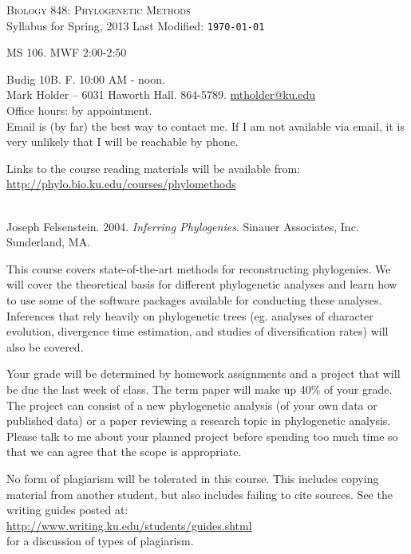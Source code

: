 \documentclass[11pt]{article}
\begin{document}
{\center
\Large
\textsc{Biology 848: Phylogenetic Methods}\\
\vskip 1cm
\large Syllabus for Spring, 2013 \hskip 6cm Last Modified: {\tt  \today}
}


\vskip 1cm
\par MS 106. MWF 2:00-2:50\\
\par Budig 10B. F. 10:00 AM - noon.\\

\vskip 2mm
\noindent Mark Holder -- 6031 Haworth Hall. 864-5789. \href{mailto:mtholder@ku.edu}{mtholder@ku.edu}\\
Office hours: by appointment.\\
Email is (by far) the best way to contact me.  If I am not available via email, it is very unlikely that I will be reachable by phone.

\vskip 2mm
\par
	Links to the course reading materials will be available from:\\ \url{http://phylo.bio.ku.edu/courses/phylomethods}

\vskip 2mm
\\
Joseph Felsenstein. 2004. {\it Inferring Phylogenies}. Sinauer Associates, Inc. Sunderland, MA.\par

\vskip 2mm
This course covers state-of-the-art methods for reconstructing phylogenies. We will cover the theoretical basis for different phylogenetic analyses and learn how to use some of the software packages available for conducting these analyses. Inferences that rely heavily on phylogenetic trees (eg. analyses of character evolution, divergence time estimation, and studies of diversification rates) will also be covered.

\vskip 2mm\par
Your grade will be determined by homework assignments and a project that will be due the last week of class.
The term paper will make up 40\% of your grade.
The project can consist of a new phylogenetic analysis (of your own data or published data) or a paper reviewing a research topic in phylogenetic analysis. 
Please talk to me about your planned project before spending too much time so that we can agree that the scope is appropriate.

\vskip 2mm
\par
No form of plagiarism will be tolerated in this course.
This includes copying material from another student, but also includes failing to cite sources.
See the writing guides posted at:\\
\url{http://www.writing.ku.edu/students/guides.shtml}\\
for a discussion of types of plagiarism. 
\end{document}
